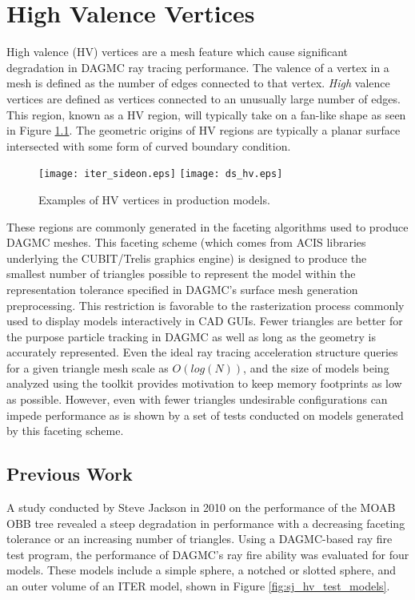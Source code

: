 
\chapter{High Valence Vertices}\label{ch:high_valence}

High valence (HV) vertices are a mesh feature which cause significant degradation in
DAGMC ray tracing performance. The valence of a vertex in a mesh is defined as
the number of edges connected to that vertex. \textit{High} valence vertices are
defined as vertices connected to an unusually large number of edges. This
region, known as a HV region, will typically take on a fan-like shape
as seen in Figure \ref{fig:hv_examples}.  The geometric origins of HV
regions are typically a planar surface intersected with some form of curved
boundary condition. 

\begin{figure}[H]
  \centering
  \texttt{[image: iter\_sideon.eps]}
  \texttt{[image: ds\_hv.eps]}
  \caption[Examples of HV vertices in production models.]{Examples of HV
    vertices in production models.}
  \label{fig:hv_examples}
\end{figure}

These regions are commonly generated in the faceting algorithms used to produce
DAGMC meshes. This faceting scheme (which comes from ACIS libraries underlying
the CUBIT/Trelis graphics engine) is designed to produce the smallest number of
triangles possible to represent the model within the representation tolerance
specified in DAGMC's surface mesh generation preprocessing. This restriction is
favorable to the rasterization process commonly used to display models
interactively in CAD GUIs. Fewer triangles are better for the purpose
particle tracking in DAGMC as well as long as the geometry is accurately
represented. Even the ideal ray tracing acceleration structure queries for a
given triangle mesh scale as $O(log(N))$, and the size of models being analyzed
using the toolkit provides motivation to keep memory footprints as low as
possible. However, even with fewer triangles undesirable configurations can
impede performance as is shown by a set of tests conducted on models generated
by this faceting scheme.

\section{Previous Work}

A study conducted by Steve Jackson in 2010 on the performance of the MOAB 
OBB tree revealed a steep degradation in performance with a decreasing faceting
tolerance or an increasing number of triangles. Using a DAGMC-based ray fire
test program, the performance of DAGMC's ray fire ability was evaluated for four
models. These models include a simple sphere, a notched or slotted sphere, and
an outer volume of an ITER model, shown in Figure \ref{fig:sj_hv_test_models}.

